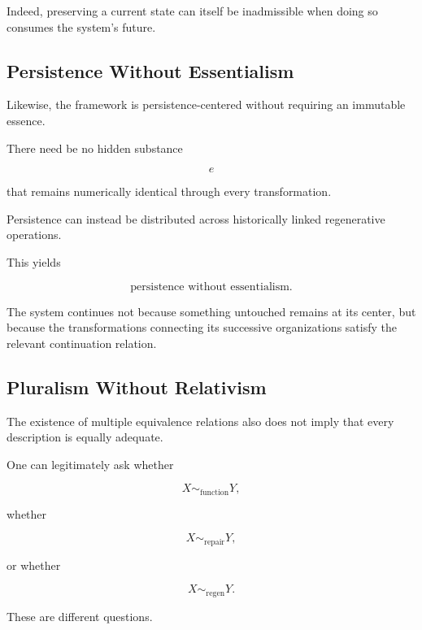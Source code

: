 \documentclass[11pt]{article}
\theoremstyle{remark}
\begin{document}
Indeed, preserving a current state can itself be inadmissible when doing so consumes the system's future.

\subsection{Persistence Without Essentialism}

Likewise, the framework is persistence-centered without requiring an immutable essence.

There need be no hidden substance

\begin{equation}
e
\end{equation}

that remains numerically identical through every transformation.

Persistence can instead be distributed across historically linked regenerative operations.

This yields

\begin{equation}
\text{persistence without essentialism}.
\end{equation}

The system continues not because something untouched remains at its center, but because the transformations connecting its successive organizations satisfy the relevant continuation relation.

\subsection{Pluralism Without Relativism}

The existence of multiple equivalence relations also does not imply that every description is equally adequate.

One can legitimately ask whether

\begin{equation}
X\sim_{\mathrm{function}}Y,
\end{equation}

whether

\begin{equation}
X\sim_{\mathrm{repair}}Y,
\end{equation}

or whether

\begin{equation}
X\sim_{\mathrm{regen}}Y.
\end{equation}

These are different questions.
\end{document}
